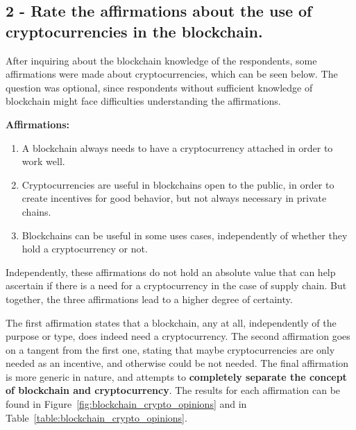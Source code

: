 \subsection*{2 - Rate the affirmations about the use of cryptocurrencies in the blockchain.}

After inquiring about the blockchain knowledge of the respondents, some affirmations were made about cryptocurrencies, which can be seen below. The question was optional, since respondents without sufficient knowledge of blockchain might face difficulties understanding the affirmations.


\textbf{Affirmations: }
\begin{enumerate}
\item A blockchain always needs to have a cryptocurrency attached in order to work well.
\item Cryptocurrencies are useful in blockchains open to the public, in order to create incentives for good behavior, but not always necessary in private chains.
\item Blockchains can be useful in some uses cases, independently of whether they hold a cryptocurrency or not.
\end{enumerate}

Independently, these affirmations do not hold an absolute value that can help ascertain if there is a need for a cryptocurrency in the case of supply chain. But together, the three affirmations lead to a higher degree of certainty.

The first affirmation states that a blockchain, any at all, independently of the purpose or type, does indeed need a cryptocurrency. The second affirmation goes on a tangent from the first one, stating that maybe cryptocurrencies are only needed as an incentive, and otherwise could be not needed. The final affirmation is more generic in nature, and attempts to \textbf{completely separate the concept of blockchain and cryptocurrency}. The results for each affirmation can be found in Figure~\ref{fig:blockchain_crypto_opinions} and in Table~\ref{table:blockchain_crypto_opinions}.

